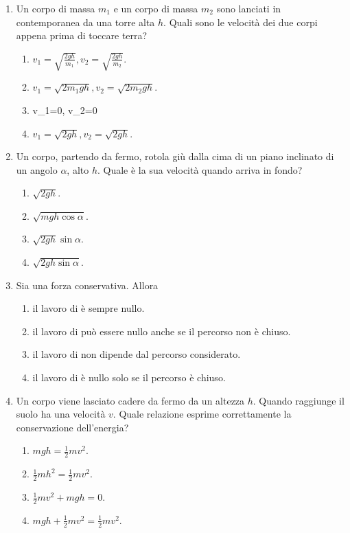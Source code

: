 \documentclass{article}
\begin{document}
\begin{enumerate}
  \item Un corpo di massa $m_1$ e un corpo di massa $m_2$ sono lanciati in contemporanea da una torre alta $h$. Quali sono le velocità dei due corpi appena prima di toccare terra?
  \begin{enumerate}[label=\Alph*.]
    \item $v_1=\sqrt{\frac{2gh}{m_1}}, v_2=\sqrt{\frac{2gh}{m_2}}$.
    \item $v_1=\sqrt{2m_1gh}, v_2=\sqrt{2m_2gh}$.
    \item v_1=0, v_2=0
    \item $v_1=\sqrt{2gh}, v_2=\sqrt{2gh}$.
  \end{enumerate}
  \item Un corpo, partendo da fermo, rotola giù dalla cima di un piano inclinato di un angolo $\alpha$, alto $h$. Quale è la sua velocità quando arriva in fondo?
  \begin{enumerate}[label=\Alph*.]
    \item $\sqrt{2gh}$.
    \item $\sqrt{mgh\cos\alpha}$.
    \item $\sqrt{2gh}\sin\alpha$.
    \item $\sqrt{2gh\sin\alpha}$.
  \end{enumerate}
  \item Sia  una forza conservativa. Allora
  \begin{enumerate}[label=\Alph*.]
    \item il lavoro di  è sempre nullo.
    \item il lavoro di  può essere nullo anche se il percorso non è chiuso.
    \item il lavoro di  non dipende dal percorso considerato.
    \item il lavoro di  è nullo solo se il percorso è chiuso.
  \end{enumerate}
  \item Un corpo viene lasciato cadere da fermo da un altezza $h$. Quando raggiunge il suolo ha una velocità $v$. Quale relazione esprime correttamente la conservazione dell'energia?
  \begin{enumerate}[label=\Alph*.]
    \item $mgh=\frac{1}{2}mv^2$.
    \item $\frac{1}{2}mh^2=\frac{1}{2}mv^2$.
    \item $\frac{1}{2}mv^2+mgh=0.$
    \item $mgh+\frac{1}{2}mv^2=\frac{1}{2}mv^2.$

\end{enumerate}
\end{enumerate}
\end{document}
